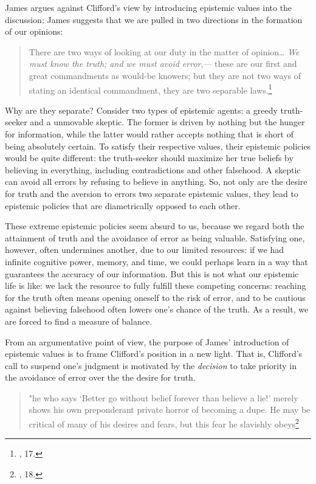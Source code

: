 James argues against Clifford's view by introducing epistemic values
into the discussion: James suggests that we are pulled in two directions
in the formation of our opinions:

\begin{quote}
There are two ways of looking at our duty in the matter of
opinion\ldots{} \emph{We must know the truth; and we must avoid
error},--- these are our first and great commandments as would-be
knowers; but they are not two ways of stating an identical commandment,
they are two separable laws.\footnote{\cite{jameswill}, 17.}
\end{quote}

Why are they separate? Consider two types of epistemic agents: a greedy
truth-seeker and a unmovable skeptic. The former is driven by nothing
but the hunger for information, while the latter would rather accepts
nothing that is short of being absolutely certain. To satisfy their
respective values, their epistemic policies would be quite different:
the truth-seeker should maximize her true beliefs by believing in
everything, including contradictions and other falsehood. A skeptic can
avoid all errors by refusing to believe in anything. So, not only are
the desire for truth and the aversion to errors two separate epistemic
values, they lead to epistemic policies that are diametrically opposed
to each other.

These extreme epistemic policies seem absurd to us, because we regard
both the attainment of truth and the avoidance of error as being
valuable. Satisfying one, however, often undermines another, due to our
limited resources: if we had infinite cognitive power, memory, and time,
we could perhaps learn in a way that guarantees the accuracy of our
information. But this is not what our epistemic life is like: we lack
the resource to fully fulfill these competing concerns: reaching for the
truth often means opening oneself to the risk of error, and to be
cautious against believing falsehood often lowers one's chance of the
truth. As a result, we are forced to find a measure of balance.

From an argumentative point of view, the purpose of James' introduction
of epistemic values is to frame Clifford's position in a new light. That
is, Clifford's call to suspend one's judgment is motivated by the
\emph{decision} to take priority in the avoidance of error over the the
desire for truth.

\begin{quote}
"he who says `Better go without belief forever than believe a lie!'
merely shows his own preponderant private horror of becoming a dupe. He
may be critical of many of his desires and fears, but this fear he
slavishly obeys\footnote{\cite{jameswill}, 18.}
\end{quote}

